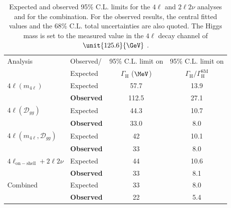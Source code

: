 \begin{table}
\begin{center}
\caption[Expected and observed 95\% C.L. limits for the $4\ell$ and $2\ell2\nu$ analyses and for the combination. For the observed results, the central fitted values and the 68\% C.L. total uncertainties are also quoted. The Higgs mass is set to the measured value in the $4\ell$ decay channel of $\unit{125.6}{\GeV}$.]{Expected and observed 95\% C.L. limits for the $4\ell$ and $2\ell2\nu$ analyses and for the combination. For the observed results, the central fitted values and the 68\% C.L. total uncertainties are also quoted. The Higgs mass is set to the measured value in the $4\ell$ decay channel of $\unit{125.6}{\GeV}$ \cite{CMS_AN_2014_018,Khachatryan:2014iha}.}
\label{tab:Fit_results}
\begin{tabular}{l | l | c c }
\hline
Analysis & Observed/ & 95\% C.L. limit on &  95\% C.L. limit on \\
               & Expected  &  $\Gamma_{\mathrm{H}}$ ($\MeV$) & $\Gamma_{\mathrm{H}}/\Gamma^{\mathrm{SM}}_{\mathrm{H}}$ \\
\hline \hline
$4\ell \left(m_{4\ell}\right)$ & Expected & 57.7 & 13.9  \\
\hline
& {\bf Observed} & 112.5 & 27.1  \\
\hline\hline
$4\ell \left(\mathcal{D}_{gg}\right)$ & Expected & 44.3 & 10.7 \\
\hline
& {\bf Observed} & 33.0 & 8.0  \\
\hline\hline
$4\ell \left(m_{4\ell}, \mathcal{D}_{gg}\right)$ & Expected & 42 & 10.1 \\
\hline
& {\bf Observed} & 33 & 8.0 \\
\hline\hline
$4\ell_{\mathrm{on-shell}} + 2\ell2\nu$ & Expected & 44 & 10.6 \\
\hline
& {\bf Observed} & 33 & 8.1  \\
\hline\hline
Combined & Expected & 33 & 8.0 \\
\hline
& {\bf Observed} & 22 & 5.4 \\
\hline\hline
\end{tabular}
\end{center}
\end{table}

